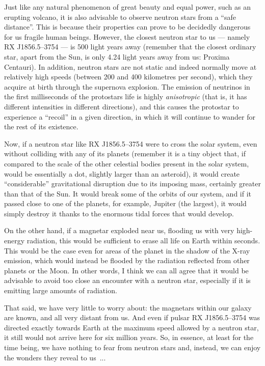 Just like any natural phenomenon of great beauty and equal power, such as an erupting
volcano, it is also advisable to observe neutron stars from a ``safe distance''. This is
because their properties can prove to be decidedly dangerous for us fragile human
beings. However, the closest neutron star to us --- namely RX
J1856.5--3754 --- is 500 light years away (remember that the closest
ordinary star, apart from the Sun, is only 4.24 light years away from us: Proxima
Centauri). In addition, neutron stars are not static and indeed
normally move at relatively high speeds (between 200 and 400 kilometres per second),
which they acquire at birth through the supernova explosion. The emission of
neutrinos in the first milliseconds of the
protostar\textquotesingle s life is highly \emph{anisotropic} (that
is, it has different intensities in different directions), and this causes the protostar
to experience a ``recoil'' in a given direction, in which it will continue to wander for
the rest of its existence.

Now, if a neutron star like RX J1856.5--3754 were to cross the solar
system, even without colliding with any of its planets (remember it is a tiny object
that, if compared to the scale of the other celestial bodies present in the solar
system, would be essentially a dot, slightly larger than an asteroid), it would create
``considerable'' gravitational disruption due to its imposing mass, certainly greater
than that of the Sun. It would break some of the orbits of our
system, and if it passed close to one of the planets, for example, Jupiter (the
largest), it would simply destroy it thanks to the enormous tidal
forces that would develop.

On the other hand, if a magnetar exploded near us, flooding us with very high-energy
radiation, this would be sufficient to erase all life on Earth within seconds. This
would be the case even for areas of the planet in the shadow of the
X-ray emission, which would instead be flooded by the radiation
reflected from other planets or the Moon. In other words, I think we
can all agree that it would be advisable to avoid too close an encounter with a neutron
star, especially if it is emitting large amounts of radiation.

That said, we have very little to worry about: the magnetars within
our galaxy are known, and all very distant from us. And even if pulsar RX
J1856.5--3754 was directed exactly towards Earth at the maximum speed
allowed by a neutron star, it still would not arrive here for six million years. So, in
essence, at least for the time being, we have nothing to fear from neutron stars and,
instead, we can enjoy the wonders they reveal to us~...
